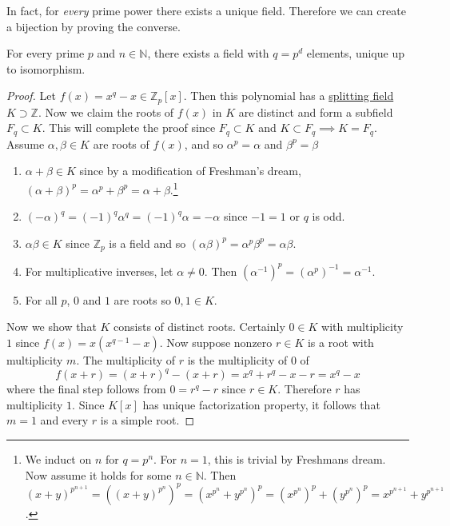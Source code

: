   In fact, for \textit{every} prime power there exists a unique field. Therefore we can create a bijection by proving the converse. 

  \begin{theorem}
    \label{thm:field-for-every-pd}
    For every prime $p$ and $n \in \mathbb{N}$, there exists a field with $q = p^d$ elements, unique up to isomorphism.  
  \end{theorem} 
  \begin{proof} 
    Let $f(x) = x^q - x \in \mathbb{Z}_p [x]$. Then this polynomial has a \hyperref[def:splitting-field]{splitting field} $K \supset \mathbb{Z}$. Now we claim the roots of $f(x)$ in $K$ are distinct and form a subfield $F_q \subset K$. This will complete the proof since $F_q \subset K$ and $K \subset F_q \implies K = F_q$. Assume $\alpha, \beta \in K$ are roots of $f(x)$, and so $\alpha^p = \alpha$ and $\beta^p = \beta$
    \begin{enumerate}
      \item $\alpha + \beta \in K$ since by a modification of Freshman's dream, $(\alpha + \beta)^p = \alpha^p + \beta^p = \alpha + \beta$.\footnote{We induct on $n$ for $q = p^n$. For $n=1$, this is trivial by Freshmans dream. Now assume it holds for some $n \in \mathbb{N}$. Then $(x + y)^{p^{n+1}} = ( (x + y)^{p^n} )^p = (x^{p^n} + y^{p^n})^p = (x^{p^n})^p + (y^{p^n})^p = x^{p^{n+1}} + y^{p^{n+1}}$. }
      \item $(-\alpha)^q = (-1)^q \alpha^q = (-1)^q \alpha = -\alpha$ since $-1 = 1$ or $q$ is odd. 
      \item $\alpha \beta \in K$ since $\mathbb{Z}_p$ is a field and so $(\alpha \beta)^p = \alpha^p \beta^p = \alpha \beta$. 
      \item For multiplicative inverses, let $\alpha \neq 0$. Then $(\alpha^{-1})^p = (\alpha^{p})^{-1} = \alpha^{-1}$. 
      \item For all $p$, $0$ and $1$ are roots so $0, 1 \in K$. 
    \end{enumerate}
    Now we show that $K$ consists of distinct roots. Certainly $0 \in K$ with multiplicity $1$ since $f(x) = x (x^{q-1} - x)$. Now suppose nonzero $r \in K$ is a root with multiplicity $m$. The multiplicity of $r$ is the multiplicity of $0$ of 
    \begin{equation}
      f(x + r) = (x + r)^q - (x + r) = x^q + r^q - x - r = x^q - x
    \end{equation}
    where the final step follows from $0 = r^q - r$ since $r \in K$. Therefore $r$ has multiplicity $1$. Since $K[x]$ has unique factorization property, it follows that $m=1$ and every $r$ is a simple root. 


\end{proof}
